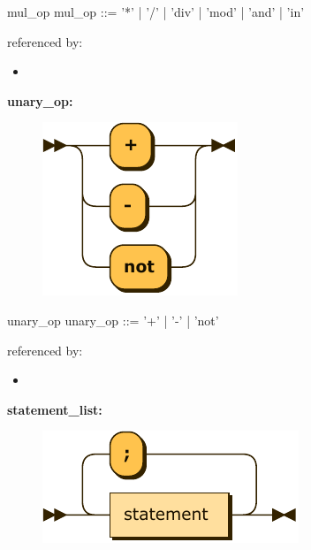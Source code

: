 \documentclass[10pt,a4paper,twoside]{article}
\providecommand{\tightlist}{%
  \setlength{\itemsep}{0pt}\setlength{\parskip}{0pt}}
\newcounter{grammarbox}[section]
\begin{document}
\begin{grammarbox}{mul\_op}
\vspace{0.5em}
mul\_op   ::= '*'
           | '/'
           | 'div'
           | 'mod'
           | 'and'
           | 'in'
\end{grammarbox}

referenced by:

\begin{itemize}
\tightlist
\item
\end{itemize}

\textbf{unary\_op:}

\begin{figure}[H]
\centering
\includegraphics{diagram/unary_op.pdf}

\end{figure}

\begin{grammarbox}{unary\_op}
\vspace{0.5em}
unary\_op ::= '+'
           | '-'
           | 'not'
\end{grammarbox}

referenced by:

\begin{itemize}
\tightlist
\item
\end{itemize}

\textbf{statement\_list:}

\begin{figure}[H]
\centering
\includegraphics{diagram/statement_list.pdf}

\end{figure}
\end{document}
